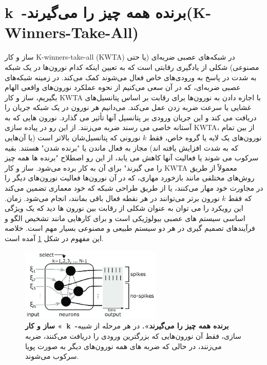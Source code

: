\clearpage
\section{k~-برنده همه چیز را می‌گیرند(K-Winners-Take-All)}
    ساز و کار 
    K-winners-take-all (KWTA) 
    در شبکه‌های عصبی ضربه‌ای
    (یا حتی مصنوعی)
    شکلی از یادگیری رقابتی است که به تعیین اینکه کدام نورون‌ها در یک شبکه به شدت در پاسخ به ورودی‌های خاص فعال می‌شوند کمک می‌کند.
    در زمینه شبکه‌های عصبی ضربه‌ای، که در آن سعی می‌کنیم از نحوه عملکرد نورون‌های واقعی الهام بگیریم، ساز و کار 
    KWTA 
    با اجازه دادن به نورون‌ها برای رقابت بر اساس پتانسیل‌های غشایی یا سرعت ضربه زدن عمل می‌کند. می‌دانیم هر نورون در یک شبکه جریان را دریافت می کند و این جریان ورودی بر پتانسیل آنها تأثیر می گذارد. نورون هایی که به آستانه خاصی می رسند ضربه می‌زنند. از این رو در پیاده سازی 
    KWTA، 
    از بین تمام نورون‌های یک لایه یا گروه خاص، فقط 
    $k$ 
    نورونی که پتانسیل‌شان بالاتر است 
    (یا آن‌هایی که به شدت افزایش یافته اند) 
    مجاز به فعال ماندن یا "برنده شدن" هستند. بقیه سرکوب می شوند یا فعالیت آنها کاهش می یابد، از این رو اصطلاح "برنده ها همه چیز را می گیرند" برای آن به کار برده می‌شود.
    ساز و کار 
    KWTA 
    معمولاً از طریق روش‌های مختلفی مانند بازخورد مهاری، که در آن نورون‌ها فعالیت نورون‌های دیگر را در مجاورت خود مهار می‌کنند، یا از طریق طراحی شبکه که خود معماری تضمین می‌کند که فقط 
    $k$ 
    نورون‌ برتر می‌توانند در هر نقطه فعال باقی بمانند، انجام می‌شود. زمان. این رویکرد را می توان به عنوان شکلی از رقابت بین نورون ها دید که یک ویژگی اساسی سیستم های عصبی بیولوژیکی است و برای کارهایی مانند تشخیص الگو و فرآیندهای تصمیم گیری در هر دو سیستم طبیعی و مصنوعی بسیار مهم است. خلاصه این مفهوم در شکل 
    \ref{fig:k-winners-take-all-schematic}
    آمده است.

    \begin{figure}[!ht]
        \centering
        \includegraphics[width=0.6\textwidth]{images/k-winners-take-all-schematic.png} 
        \captionsetup{width=.7\linewidth}
        \caption{\textbf{ ساز و کار 
        «~k~-برنده همه چیز را می‌گیرند».} در هر مرحله از شبیه سازی، فقط آن نورون‌هایی که بزرگترین ورودی را دریافت می‌کنند، ضربه می‌زنند، در حالی که ضربه های همه نورون‌های دیگر به صورت پویا سرکوب می‌شوند.
        }
        \label{fig:k-winners-take-all-schematic}
    \end{figure}

